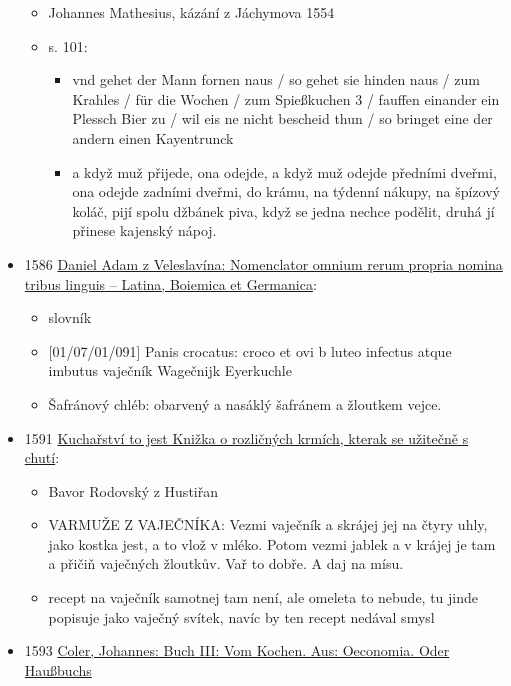 \begin{itemize}
  \begin{itemize}
  \tightlist
  \item
    Johannes Mathesius, kázání z Jáchymova 1554
  \item
    s. 101:

    \begin{itemize}
    \tightlist
    \item
      vnd gehet der Mann fornen naus / so gehet sie hinden naus / zum
      Krahles / für die Wochen / zum Spießkuchen 3 / fauffen einander
      ein Plessch Bier zu / wil eis ne nicht bescheid thun / so bringet
      eine der andern einen Kayentrunck
    \item
      a když muž přijede, ona odejde, a když muž odejde předními dveřmi,
      ona odejde zadními dveřmi, do krámu, na týdenní nákupy, na špízový
      koláč, pijí spolu džbánek piva, když se jedna nechce podělit,
      druhá jí přinese kajenský nápoj.
    \end{itemize}
  \end{itemize}
\item
  1586
  \href{https://bara.ujc.cas.cz/slovniky/velnom/velnom7.html\#CTX1229}{Daniel
  Adam z Veleslavína: Nomenclator omnium rerum propria nomina tribus
  linguis -- Latina, Boiemica et Germanica}:

  \begin{itemize}
  \tightlist
  \item
    slovník
  \item
    {[}01/07/01/091{]} Panis crocatus: croco et ovi b luteo infectus
    atque imbutus \textbar{} vaječník \textbar{} Wagečnijk \textbar{}
    Eyerkuchle
  \item
    Šafránový chléb: obarvený a nasáklý šafránem a žloutkem vejce.
  \end{itemize}
\item
  1591
  \href{https://ndk.cz/uuid/uuid:27bccb70-88d6-11e3-997d-005056827e52}{Kuchařství
  to jest Knižka o rozličných krmích, kterak se užitečně s chutí}:

  \begin{itemize}
  \tightlist
  \item
    Bavor Rodovský z Hustiřan
  \item
    VARMUŽE Z VAJEČNÍKA: Vezmi vaječník a skrájej jej na čtyry uhly,
    jako kostka jest, a to vlož v mléko. Potom vezmi jablek a v krájej
    je tam a přičiň vaječných žloutkův. Vař to dobře. A daj na mísu.
  \item
    recept na vaječník samotnej tam není, ale omeleta to nebude, tu
    jinde popisuje jako vaječný svítek, navíc by ten recept nedával
    smysl
  \end{itemize}
\item
  1593
  \href{https://www.deutschestextarchiv.de/book/view/coler_kochbuch_1593/?hl=Spi\%C3\%9Fkuchen&p=85}{Coler,
  Johannes: Buch III: Vom Kochen. Aus: Oeconomia. Oder Haußbuchs}


\end{itemize}
